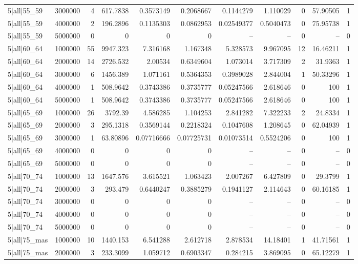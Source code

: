 \begin{tabular}{lrrrrrrrrrr}
5|all|55\_59 & 3000000 & 4 & 617.7838 & 0.3573149 & 0.2068667 & 0.1144279 & 1.110029 & 0 & 57.90505 & 1 \\
5|all|55\_59 & 4000000 & 2 & 196.2896 & 0.1135303 & 0.0862953 & 0.02549377 & 0.5040473 & 0 & 75.95738 & 1 \\
5|all|55\_59 & 5000000 & 0 & 0 & 0 & 0 & -- & -- & 0 & -- & 0 \\
5|all|60\_64 & 1000000 & 55 & 9947.323 & 7.316168 & 1.167348 & 5.328573 & 9.967095 & 12 & 16.46211 & 1 \\
5|all|60\_64 & 2000000 & 14 & 2726.532 & 2.00534 & 0.6349604 & 1.073014 & 3.717309 & 2 & 31.9363 & 1 \\
5|all|60\_64 & 3000000 & 6 & 1456.389 & 1.071161 & 0.5364353 & 0.3989028 & 2.844004 & 1 & 50.33296 & 1 \\
5|all|60\_64 & 4000000 & 1 & 508.9642 & 0.3743386 & 0.3735777 & 0.05247566 & 2.618646 & 0 & 100 & 1 \\
5|all|60\_64 & 5000000 & 1 & 508.9642 & 0.3743386 & 0.3735777 & 0.05247566 & 2.618646 & 0 & 100 & 1 \\
5|all|65\_69 & 1000000 & 26 & 3792.39 & 4.586285 & 1.104253 & 2.841282 & 7.322233 & 2 & 24.8334 & 1 \\
5|all|65\_69 & 2000000 & 3 & 295.1318 & 0.3569144 & 0.2218324 & 0.1047608 & 1.208645 & 0 & 62.04939 & 1 \\
5|all|65\_69 & 3000000 & 1 & 63.80896 & 0.07716666 & 0.07725731 & 0.01073514 & 0.5524206 & 0 & 100 & 1 \\
5|all|65\_69 & 4000000 & 0 & 0 & 0 & 0 & -- & -- & 0 & -- & 0 \\
5|all|65\_69 & 5000000 & 0 & 0 & 0 & 0 & -- & -- & 0 & -- & 0 \\
5|all|70\_74 & 1000000 & 13 & 1647.576 & 3.615521 & 1.063423 & 2.007267 & 6.427809 & 0 & 29.3799 & 1 \\
5|all|70\_74 & 2000000 & 3 & 293.479 & 0.6440247 & 0.3885279 & 0.1941127 & 2.114643 & 0 & 60.16185 & 1 \\
5|all|70\_74 & 3000000 & 0 & 0 & 0 & 0 & -- & -- & 0 & -- & 0 \\
5|all|70\_74 & 4000000 & 0 & 0 & 0 & 0 & -- & -- & 0 & -- & 0 \\
5|all|70\_74 & 5000000 & 0 & 0 & 0 & 0 & -- & -- & 0 & -- & 0 \\
5|all|75\_mas & 1000000 & 10 & 1440.153 & 6.541288 & 2.612718 & 2.878534 & 14.18401 & 1 & 41.71561 & 1 \\
5|all|75\_mas & 2000000 & 3 & 233.3099 & 1.059712 & 0.6903347 & 0.284215 & 3.869095 & 0 & 65.12279 & 1 \\

\end{tabular}
